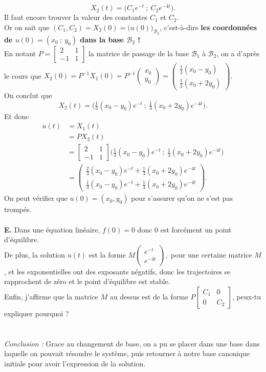 \documentclass[12pt]{article}
\begin{document}
$$X_2(t) = \Big( C_1 e^{-t}~;~C_2e^{-4t}\Big).$$
Il faut encore trouver la valeur des constantes $C_1$ et $C_2$.\\
Or on sait que $(C_1,C_2) = X_2(0)=\big( u(0) \big)_{\mathcal{B}_2}$, c'est-à-dire \textbf{les coordonnées de $u(0) = ( x_0~;~y_0)$ dans la base $\mathcal{B}_2$ !}\\
En notant $P=\begin{bmatrix} 2 & 1\\ -1 & 1 \end{bmatrix}$ la matrice de passage de la base $\mathcal{B}_1$ à $\mathcal{B}_2$, on a d'après le cours que 
$X_2(0) = P^{-1}X_1(0)= P^{-1}\begin{pmatrix} x_0 \\y_0 \end{pmatrix} = \begin{pmatrix} \frac{1}{3} (x_0-y_0) \\ \frac{1}{3}(x_0+2y_0) \end{pmatrix}$.\\
On conclut que 
$$X_2(t) = \Big( \tfrac{1}{3} (x_0-y_0) e^{-t}~;~\tfrac{1}{3}(x_0+2y_0)e^{-4t}\Big).$$
Et donc 
\begin{align*}
u(t) &= X_1(t) \\
&= PX_2(t) \\
&= \begin{bmatrix} 2 & 1\\ -1 & 1 \end{bmatrix} \Big( \tfrac{1}{3} (x_0-y_0) e^{-t}~;~\tfrac{1}{3}(x_0+2y_0)e^{-4t}\Big) \\
&= \begin{pmatrix}
\tfrac{2}{3} (x_0-y_0) e^{-t} + \tfrac{1}{3}(x_0+2y_0)e^{-4t}\\
\tfrac{1}{3} (x_0-y_0) e^{-t} + \tfrac{1}{3}(x_0+2y_0)e^{-4t}
\end{pmatrix}.
\end{align*}
On peut vérifier que $u(0)=(x_0,y_0)$ pour s'assurer qu'on ne s'est pas trompés.\\
~\\
\noindent \textbf{E.} Dans une équation linéaire, $f(0)=0$ donc $0$ est forcément un point d'équilibre.\\
De plus, la solution $u(t)$ est la forme $ M \begin{pmatrix} e^{-t}\\e^{-4t} \end{pmatrix},$ pour une certaine matrice $M$, et les exponentielles ont des exposants négatifs, donc les trajectoires se rapprochent de zéro et le point d'équilibre est stable.\\
Enfin, j'affirme que la matrice $M$ au dessus est de la forme $P\begin{bmatrix} C_1 & 0\\ 0 & C_2 \end{bmatrix}$, peux-tu expliquer pourquoi ?\\
~\\~\\
\emph{Conclusion :} Grace au changement de base, on a pu se placer dans une base dans laquelle on pouvait résoudre le système, puis retourner à notre base canonique initiale pour avoir l'expression de la solution.
\end{document}
